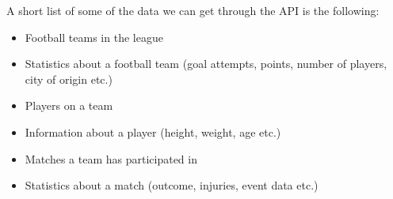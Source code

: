 \documentclass[Report.tex]{subfiles}
\begin{document}
A short list of some of the data we can get through the API is the following:
\begin{itemize}
\item Football teams in the league
\item Statistics about a football team (goal attempts, points, number of players, city of origin etc.)
\item Players on a team
\item Information about a player (height, weight, age etc.)
\item Matches a team has participated in
\item Statistics about a match (outcome, injuries, event data etc.)
\end{itemize}
\end{document}
